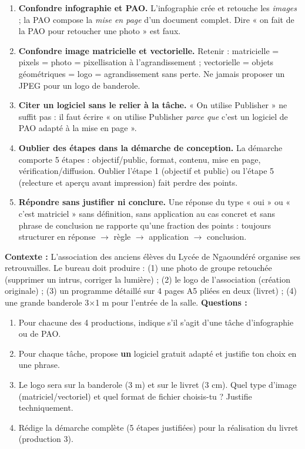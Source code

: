 \documentclass[11pt]{article}
\begin{document}
\begin{attention}
\begin{enumerate}
\item \textbf{Confondre infographie et PAO.} L'infographie crée et retouche les \emph{images} ; la PAO compose la \emph{mise en page} d'un document complet. Dire « on fait de la PAO pour retoucher une photo » est faux.
\item \textbf{Confondre image matricielle et vectorielle.} Retenir : matricielle = pixels = photo = pixellisation à l'agrandissement ; vectorielle = objets géométriques = logo = agrandissement sans perte. Ne jamais proposer un JPEG pour un logo de banderole.
\item \textbf{Citer un logiciel sans le relier à la tâche.} « On utilise Publisher » ne suffit pas : il faut écrire « on utilise Publisher \emph{parce que} c'est un logiciel de PAO adapté à la mise en page ».
\item \textbf{Oublier des étapes dans la démarche de conception.} La démarche comporte 5 étapes : objectif/public, format, contenu, mise en page, vérification/diffusion. Oublier l'étape 1 (objectif et public) ou l'étape 5 (relecture et aperçu avant impression) fait perdre des points.
\item \textbf{Répondre sans justifier ni conclure.} Une réponse du type « oui » ou « c'est matriciel » sans définition, sans application au cas concret et sans phrase de conclusion ne rapporte qu'une fraction des points : toujours structurer en réponse $\rightarrow$ règle $\rightarrow$ application $\rightarrow$ conclusion.
\end{enumerate}
\end{attention}

\begin{exercice}
\textbf{Contexte :} L'association des anciens élèves du Lycée de Ngaoundéré organise ses retrouvailles. Le bureau doit produire : (1) une photo de groupe retouchée (supprimer un intrus, corriger la lumière) ; (2) le logo de l'association (création originale) ; (3) un programme détaillé sur 4 pages A5 pliées en deux (livret) ; (4) une grande banderole 3$\times$1 m pour l'entrée de la salle.
\textbf{Questions :}
\begin{enumerate}
\item Pour chacune des 4 productions, indique s'il s'agit d'une tâche d'infographie ou de PAO.
\item Pour chaque tâche, propose \textbf{un} logiciel gratuit adapté et justifie ton choix en une phrase.
\item Le logo sera sur la banderole (3 m) et sur le livret (3 cm). Quel type d'image (matriciel/vectoriel) et quel format de fichier choisis-tu ? Justifie techniquement.
\item Rédige la démarche complète (5 étapes justifiées) pour la réalisation du livret (production 3).
\end{enumerate}
\end{exercice}
\end{document}
